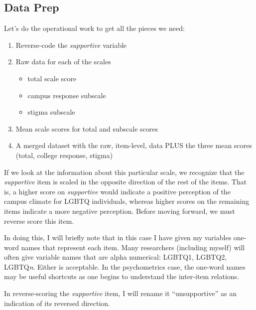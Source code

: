 \documentclass[
  english,
]{book}
\newenvironment{Shaded}{\begin{snugshade}}{\end{snugshade}}
\newcommand{\CommentTok}[1]{\textcolor[rgb]{0.56,0.35,0.01}{\textit{#1}}}
\newcommand{\DataTypeTok}[1]{\textcolor[rgb]{0.13,0.29,0.53}{#1}}
\newcommand{\DecValTok}[1]{\textcolor[rgb]{0.00,0.00,0.81}{#1}}
\newcommand{\KeywordTok}[1]{\textcolor[rgb]{0.13,0.29,0.53}{\textbf{#1}}}
\newcommand{\NormalTok}[1]{#1}
\newcommand{\OperatorTok}[1]{\textcolor[rgb]{0.81,0.36,0.00}{\textbf{#1}}}
\newcommand{\StringTok}[1]{\textcolor[rgb]{0.31,0.60,0.02}{#1}}
\providecommand{\tightlist}{%
  \setlength{\itemsep}{0pt}\setlength{\parskip}{0pt}}
\begin{document}
\hypertarget{data-prep}{%
\subsection{Data Prep}\label{data-prep}}

Let's do the operational work to get all the pieces we need:

\begin{enumerate}
\def\labelenumi{\arabic{enumi}.}
\tightlist
\item
  Reverse-code the \emph{supportive} variable
\item
  Raw data for each of the scales

  \begin{itemize}
  \tightlist
  \item
    total scale score
  \item
    campus response subscale
  \item
    stigma subscale
  \end{itemize}
\item
  Mean scale scores for total and subscale scores
\item
  A merged dataset with the raw, item-level, data PLUS the three mean scores (total, college response, stigma)
\end{enumerate}

If we look at the information about this particular scale, we recognize that the \emph{supportive} item is scaled in the opposite direction of the rest of the items. That is, a higher score on \emph{supportive} would indicate a positive perception of the campus climate for LGBTQ individuals, whereas higher scores on the remaining items indicate a more negative perception. Before moving forward, we must reverse score this item.

In doing this, I will briefly note that in this case I have given my variables one-word names that represent each item. Many researchers (including myself) will often give variable names that are alpha numerical: LGBTQ1, LGBTQ2, LGBTQ\emph{n}. Either is acceptable. In the psychometrics case, the one-word names may be useful shortcuts as one begins to understand the inter-item relations.

In reverse-scoring the \emph{supportive} item, I will rename it ``unsupportive'' as an indication of its reversed direction.

\begin{Shaded}
\end{Shaded}
\end{document}
